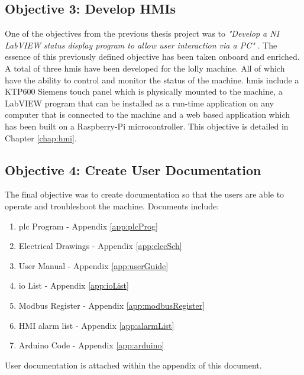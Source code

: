         
    \subsection{Objective 3: Develop HMIs}
        
        One of the objectives from the previous thesis project was to \textit{"Develop a NI LabVIEW status display program to allow user interaction via a PC"} \cite{thesisJodie}. The essence of this previously defined objective has been taken onboard and enriched. A total of three \acrshort{hmi}s have been developed for the lolly machine. All of which have the ability to control and monitor the status of the machine. \acrshort{hmi}s include a KTP600 Siemens touch panel which is physically mounted to the machine, a LabVIEW program that can be installed as a run-time application on any computer that is connected to the machine and a web based application which has been built on a Raspberry-Pi microcontroller. This objective is detailed in Chapter \ref{chap:hmi}.
        
    \subsection{Objective 4: Create User Documentation}
        The final objective was to create documentation so that the users are able to operate and troubleshoot the machine. Documents include:

        \begin{enumerate}
            \item   \acrshort{plc} Program - Appendix \ref{app:plcProg}
            \item   Electrical Drawings - Appendix \ref{app:elecSch}
            \item   User Manual - Appendix \ref{app:userGuide}
            \item   \acrshort{io} List - Appendix \ref{app:ioList}
            \item   Modbus Register - Appendix \ref{app:modbusRegister}
            \item   HMI alarm list - Appendix \ref{app:alarmList}
            \item   Arduino Code - Appendix \ref{app:arduino}
        \end{enumerate}
        
        User documentation is attached within the appendix of this document.


